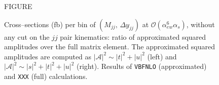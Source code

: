 \begin{figure}[hbt]
\centering
FIGURE
\caption{Cross--sections (fb) per bin of $(M_{jj},\,\Delta y_{jj})$ at $\mathcal{O}(\alpha_{ew}^6\alpha_s)$, without any cut on the $jj$ pair kinematics: ratio of approximated squared amplitudes over the full matrix element. The approximated squared amplitudes are computed as $|\mathcal{A}|^2 \sim |t|^2 + |u|^2$ (left) and $|\mathcal{A}|^2 \sim |s|^2 + |t|^2 + |u|^2$ (right). Results of \texttt{VBFNLO} (approximated) and \texttt{XXX} (full) calculations.}\label{fig:ratio2d_NLO}
\end{figure}